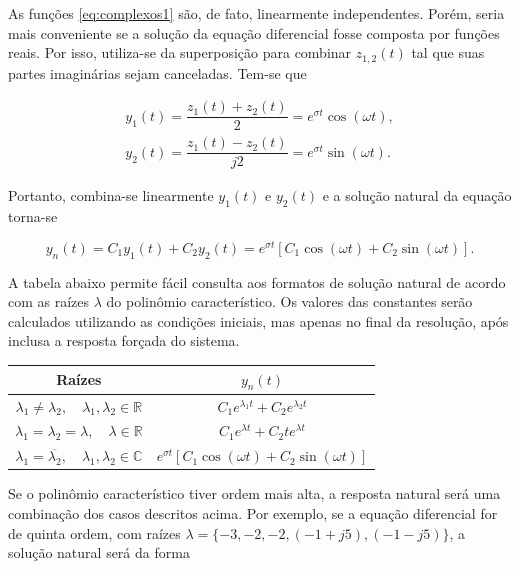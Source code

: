 \documentclass{article}
\numberwithin{equation}{section}
\let\dfr\dfrac
\begin{document}
\noindent As funções \eqref{eq:complexos1} são, de fato, linearmente independentes. Porém, seria mais conveniente se a solução da equação diferencial fosse composta por funções reais. Por isso, utiliza-se da superposição para combinar $z_{1,2}(t)$ tal que suas partes imaginárias sejam canceladas. Tem-se que

\begin{gather*}
    y_1(t) = \dfr{z_1(t)+z_2(t)}{2} = e^{\sigma t}\cos(\omega t),
    \\
    y_2(t) = \dfr{z_1(t)-z_2(t)}{j2} = e^{\sigma t}\sin(\omega t).
\end{gather*}

\noindent Portanto, combina-se linearmente $y_1(t)$ e $y_2(t)$ e a solução natural da equação torna-se

\begin{equation}
    y_n(t) = C_1y_1(t) + C_2y_2(t) = e^{\sigma t}[C_1\cos(\omega t)+C_2\sin(\omega t)].
\end{equation}

\vspace{4mm}

A tabela abaixo permite fácil consulta aos formatos de solução natural de acordo com as raízes $\lambda$ do polinômio característico. Os valores das constantes serão calculados utilizando as condições iniciais, mas apenas no final da resolução, após inclusa a resposta forçada do sistema.

\begin{center}
    \begin{tabular}{|c|c|}
        \hline
        Raízes & $y_n(t)$
        \\ \hline
        $\lambda_1 \neq \lambda_2, \quad \lambda_1,\lambda_2 \in \mathbb{R}$ & $C_1e^{\lambda_1 t}+C_2e^{\lambda_2 t}$
        \\ \hline
        $\lambda_1 = \lambda_2 = \lambda, \quad \lambda \in \mathbb{R}$ & $C_1e^{\lambda t}+C_2te^{\lambda t}$
        \\ \hline
        $\lambda_1 = \overline{\lambda_2}, \quad \lambda_1,\lambda_2 \in \mathbb{C}$ & $e^{\sigma t}[C_1\cos(\omega t)+C_2\sin(\omega t)]$
        \\ \hline
    \end{tabular}
\end{center}

Se o polinômio característico tiver ordem mais alta, a resposta natural será uma combinação dos casos descritos acima. Por exemplo, se a equação diferencial for de quinta ordem, com raízes $\lambda=\{-3,-2,-2,(-1+j5),(-1-j5)\}$, a solução natural será da forma
\end{document}
